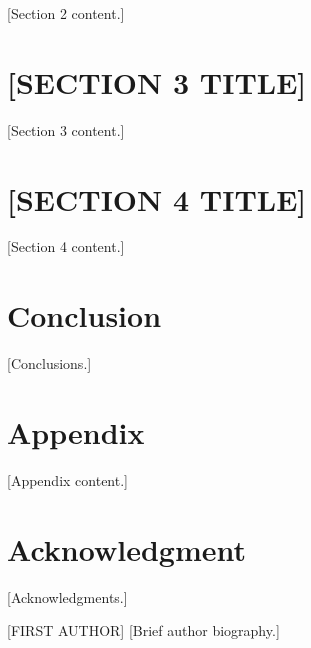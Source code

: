 \documentclass[journal]{IEEEtran}
\begin{document}
[Section 2 content.]


\section{[SECTION 3 TITLE]}
\label{sec:section3}

[Section 3 content.]


\section{[SECTION 4 TITLE]}
\label{sec:section4}

[Section 4 content.]


\section{Conclusion}
\label{sec:conclusion}

[Conclusions.]


\appendices
\section{Appendix}
[Appendix content.]


\section*{Acknowledgment}

[Acknowledgments.]




\begin{IEEEbiographynophoto}{[FIRST AUTHOR]}
[Brief author biography.]
\end{IEEEbiographynophoto}
\end{document}
